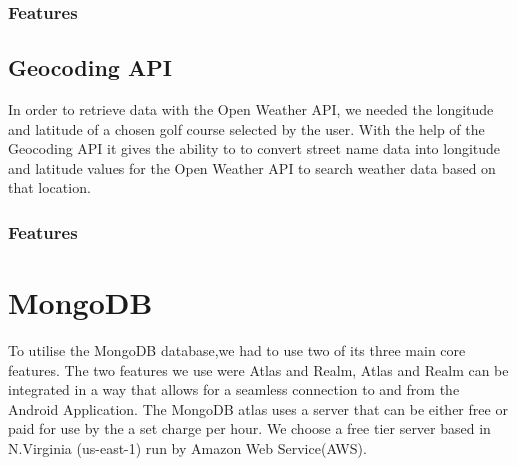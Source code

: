 \subsubsection{Features}

\subsection{Geocoding API}
In order to retrieve data with the Open Weather API, we needed the longitude and latitude of a chosen golf course selected by the user. With the help of the Geocoding API it gives the ability to to convert street name data into longitude and latitude values for the Open Weather API to search weather data based on that location.

\subsubsection{Features}

\section{MongoDB}
To utilise the MongoDB database,we had to use two of its three main core features. The two features we use were Atlas and Realm, Atlas and Realm can be integrated in a way that allows for a seamless connection to and from the Android Application. The MongoDB atlas uses a server that can be either free or paid for use by the a set charge per hour. We choose a free tier server based in N.Virginia (us-east-1) run by Amazon Web Service(AWS).
